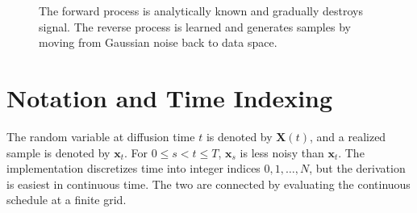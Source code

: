 \documentclass[11pt]{article}
\newcommand{\bx}{\mathbf{x}}
\newcommand{\bX}{\mathbf{X}}
\begin{document}
\begin{figure}[t]
  \centering
  \caption{The forward process is analytically known and gradually destroys signal.  The reverse process is learned and generates samples by moving from Gaussian noise back to data space.}
  \label{fig:forward_reverse_chain}
\end{figure}

\section{Notation and Time Indexing}

The random variable at diffusion time $t$ is denoted by $\bX(t)$, and a realized sample is denoted by
$\bx_t$.  For $0 \leq s < t \leq T$, $\bx_s$ is less noisy than $\bx_t$.  The implementation discretizes
time into integer indices $0,1,\ldots,N$, but the derivation is easiest in continuous time.  The two are
connected by evaluating the continuous schedule at a finite grid.
\end{document}
